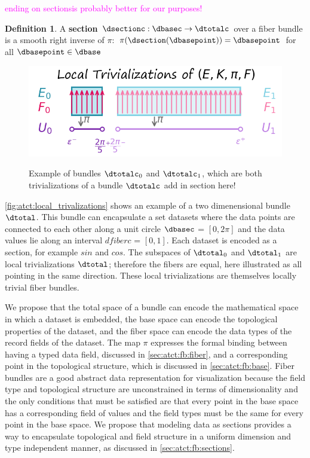 \documentclass[journal]{IEEEtran}
\newcommand{\note}[1]{\textcolor{magenta}{#1}}
\theoremstyle{definition}
\newtheorem{definition}{Definition}[section]
\theoremstyle{remark}
\begin{document}
\note{ending on sectionsis probably better for our purposes!}
\begin{definition} A \textcolor{section}{\textbf{section}} $\dsectionc: \dbasec \rightarrow \dtotalc$ over a fiber bundle is a smooth right inverse of $\pi$: $\pi(\dsection(\dbasepoint)) = \dbasepoint$ for all $\dbasepoint \in \dbase$
\end{definition}

\begin{figure}[H]
    \includegraphics[width=\columnwidth]{figures/local_trivalizations.png}
    \label{fig:atct:local_trivalizations}
    \caption{Example of bundles $\dtotalc_0$ and $\dtotalc_1$, which are both trivializations
    of a bundle $\dtotalc$ add in section here!}
\end{figure}

\autoref{fig:atct:local_trivalizations} shows an example of a two dimenensional bundle
$\dtotal$. This bundle can encapsulate a set datasets where the data points are connected to each other along a unit circle $\dbasec$ = $\left[0, 2\pi\right]$ and the data values lie along an interval $dfiberc$ = $[0,1]$. Each dataset is encoded as a section, for example $sin$ and $cos$. The subspaces of $\dtotal_{0}$ and $\dtotal_{1}$ are local trivializations $\dtotal$; therefore the fibers are equal, here illustrated as all pointing in the same direction. These local trivializations are themselves locally trivial fiber bundles.

We propose that the total space of a bundle can encode the mathematical space in which a  dataset is embedded, the base space can encode the topological properties of the dataset, and the fiber space can encode the data types of the record fields of the dataset. The map $\pi$ expresses the formal binding between having a typed data field, discussed in \autoref{sec:atct:fb:fiber}, and a corresponding point in the topological structure, which is discussed in \autoref{sec:atct:fb:base}. Fiber bundles are a good abstract data representation for visualization because the field type and topological structure are unconstrained in terms of dimensionality and the only conditions that must be satisfied are that every point in the base space has a corresponding field of values and the field types must be the same for every point in the base space. We propose that modeling data as sections provides a way to encapsulate topological and field structure in a uniform dimension and type independent manner, as discussed in \autoref{sec:atct:fb:sections}.
\end{document}
